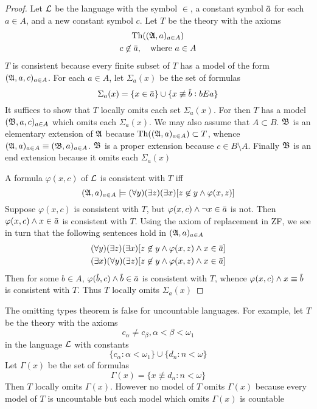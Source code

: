\documentclass[11pt]{article}
\begin{document}
\begin{proof}
Let \(\mathcal{L}\) be the language with the symbol \(\in\), a constant symbol
\(\bbar{a}\) for each \(a\in A\), and a new constant symbol \(c\). Let
\(T\) be the theory with the axioms
\begin{gather*}
   \Th((\fA,a)_{a\in A})\\
   c\not\in\bbar{a}, \quad\text{where }a\in A
\end{gather*}
\(T\) is consistent because every finite subset of \(T\) has a model of the
form \((\mathfrak{A},a,c)_{a\in A}\). For each \(a\in A\), let \(\Sigma_a(x)\) be the
set of formulas
\begin{equation*}
\Sigma_a(x)=\{x\in\bbar{a}\}\cup\{x\not\equiv\bbar{b}:bEa\}
\end{equation*}
It suffices to show that \(T\) locally omits each set \(\Sigma_a(x)\). For
then \(T\) has a model \((\mathfrak{B},a,c)_{a\in A}\) which omits each
\(\Sigma_a(x)\). We may also assume that \(A\subset B\). \(\mathfrak{B}\) is an
elementary extension of \(\mathfrak{A}\) because \(\operatorname{Th}((\mathfrak{A},a)_{a\in A})\subset T\),
whence \((\mathfrak{A},a)_{a\in A}\equiv(\mathfrak{B},a)_{a\in A}\). \(\mathfrak{B}\) is a proper
extension because \(c\in B\setminus A\). Finally \(\mathfrak{B}\) is an end extension
because it omits each \(\Sigma_a(x)\)

A formula \(\varphi(x,c)\) of \(\mathcal{L}\) is consistent with \(T\) iff
\begin{equation*}
(\mathfrak{A},a)_{a\in A}\models(\forall y)(\exists z)(\exists x)[z\not\in y\wedge\varphi(x,z)]
\end{equation*}
Suppose \(\varphi(x,c)\) is consistent with \(T\), but \(\varphi(x,c)\wedge\neg
   x\in\bbar{a}\) is not. Then \(\varphi(x,c)\wedge x\in\bbar{a}\) is  consistent with
\(T\). Using the axiom of replacement in ZF, we see in turn that the
following sentences hold in \((\mathfrak{A},a)_{a\in A}\)
\begin{gather*}
(\forall y)(\exists z)(\exists x)[z\not\in y\wedge\varphi(x,z)\wedge x\in\bbar{a}]\\
(\exists x)(\forall y)(\exists z)[z\not\in y\wedge\varphi(x,z)\wedge x\in\bbar{a}]
\end{gather*}
Then for some \(b\in A\), \(\varphi(\bbar{b},c)\wedge\bbar{b}\in\bbar{a}\) is
consistent with \(T\), whence \(\varphi(x,c)\wedge x\equiv\bbar{b}\) is consistent
with \(T\). Thus \(T\) locally omits \(\Sigma_a(x)\)
\end{proof}

The omitting types theorem is false for uncountable languages. For example,
let \(T\) be the theory with the axioms
\begin{equation*}
c_\alpha\neq c_\beta,\alpha<\beta<\omega_1
\end{equation*}
in the language \(\mathcal{L}\) with constants
\begin{equation*}
\{c_\alpha:\alpha<\omega_1\}\cup\{d_n:n<\omega\}
\end{equation*}
Let \(\Gamma(x)\) be the set of formulas
\begin{equation*}
\Gamma(x)=\{x\not\equiv d_n:n<\omega\}
\end{equation*}
Then \(T\) locally omits \(\Gamma(x)\). However no model of \(T\) omits \(\Gamma(x)\)
because every model of \(T\) is uncountable but each model which omits
\(\Gamma(x)\) is countable
\end{document}
